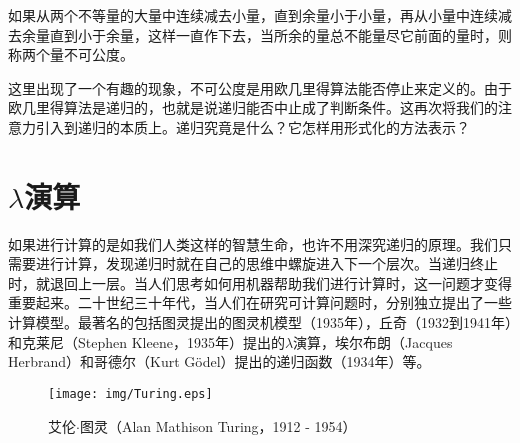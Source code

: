 \documentclass{article}
\begin{document}
\begin{proposition}
如果从两个不等量的大量中连续减去小量，直到余量小于小量，再从小量中连续减去余量直到小于余量，这样一直作下去，当所余的量总不能量尽它前面的量时，则称两个量不可公度。
\end{proposition}

这里出现了一个有趣的现象，不可公度是用欧几里得算法能否停止来定义的。由于欧几里得算法是递归的，也就是说递归能否中止成了判断条件。这再次将我们的注意力引入到递归的本质上。递归究竟是什么？它怎样用形式化的方法表示？

\begin{Exercise}
\end{Exercise}

\section{$\lambda$演算}

如果进行计算的是如我们人类这样的智慧生命，也许不用深究递归的原理。我们只需要进行计算，发现递归时就在自己的思维中螺旋进入下一个层次。当递归终止时，就退回上一层。当人们思考如何用机器帮助我们进行计算时，这一问题才变得重要起来。二十世纪三十年代，当人们在研究可计算问题时，分别独立提出了一些计算模型。最著名的包括图灵提出的图灵机模型（1935年），丘奇（1932到1941年）和克莱尼（Stephen Kleene，1935年）提出的$\lambda$演算，埃尔布朗（Jacques Herbrand）和哥德尔（Kurt Gödel）提出的递归函数（1934年）等。

\begin{figure}[htbp]
 \centering
 \texttt{[image: img/Turing.eps]}
 \captionsetup{labelformat=empty}
 \caption{艾伦$\cdot$图灵（Alan Mathison Turing，1912 - 1954）}
 \label{fig:Turing}
\end{figure}
\end{document}
